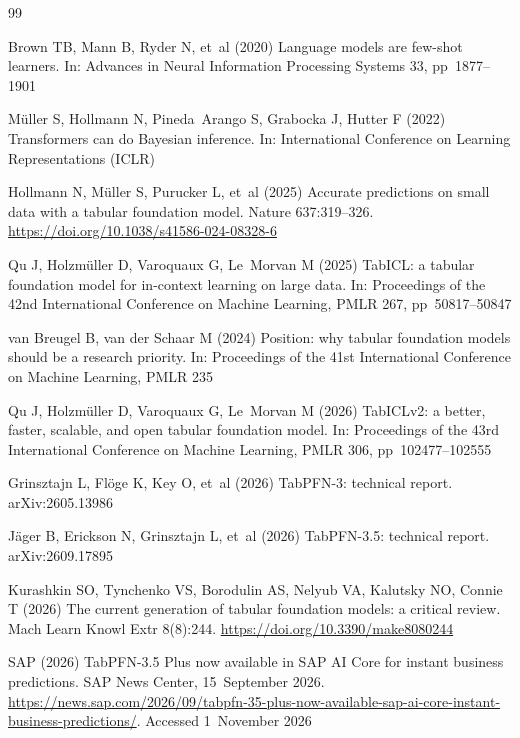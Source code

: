 \documentclass[pdflatex,sn-mathphys-num]{sn-jnl}
\begin{document}
\begin{thebibliography}{99}
\setlength{\itemsep}{2pt}\small

Brown TB, Mann B, Ryder N, et~al (2020) Language models are few-shot learners. In: Advances in
Neural Information Processing Systems 33, pp~1877--1901

Müller S, Hollmann N, Pineda~Arango S, Grabocka J, Hutter F (2022) Transformers can do Bayesian
inference. In: International Conference on Learning Representations (ICLR)

Hollmann N, Müller S, Purucker L, et~al (2025) Accurate predictions on small data with a tabular
foundation model. Nature 637:319--326. \url{https://doi.org/10.1038/s41586-024-08328-6}

Qu J, Holzmüller D, Varoquaux G, Le~Morvan M (2025) TabICL: a tabular foundation model for
in-context learning on large data. In: Proceedings of the 42nd International Conference on Machine
Learning, PMLR 267, pp~50817--50847

van Breugel B, van der Schaar M (2024) Position: why tabular foundation models should be a research
priority. In: Proceedings of the 41st International Conference on Machine Learning, PMLR 235

Qu J, Holzmüller D, Varoquaux G, Le~Morvan M (2026) TabICLv2: a better, faster, scalable, and open
tabular foundation model. In: Proceedings of the 43rd International Conference on Machine Learning, PMLR 306, pp~102477--102555

Grinsztajn L, Flöge K, Key O, et~al (2026) TabPFN-3: technical report.
arXiv:2605.13986

Jäger B, Erickson N, Grinsztajn L, et~al (2026) TabPFN-3.5: technical report.
arXiv:2609.17895

Kurashkin SO, Tynchenko VS, Borodulin AS, Nelyub VA, Kalutsky NO, Connie T (2026) The current
generation of tabular foundation models: a critical review. Mach Learn Knowl Extr 8(8):244.
\url{https://doi.org/10.3390/make8080244}

SAP (2026) TabPFN-3.5 Plus now available in SAP AI Core for instant business predictions. SAP News Center, 15~September 2026. \url{https://news.sap.com/2026/09/tabpfn-35-plus-now-available-sap-ai-core-instant-business-predictions/}.
Accessed 1~November 2026


\end{thebibliography}
\end{document}
